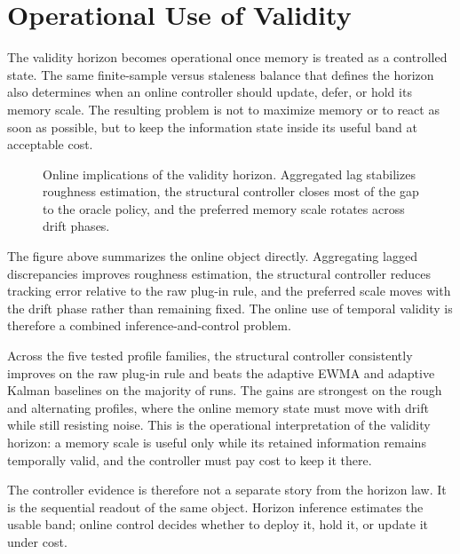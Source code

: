 \section{Operational Use of Validity}\label{sec:online_adaptation}

The validity horizon becomes operational once memory is treated as a
controlled state. The same finite-sample versus staleness balance that defines
the horizon also determines when an online controller should update, defer, or
hold its memory scale. The resulting problem is not to maximize memory or to
react as soon as possible, but to keep the information state inside its useful
band at acceptable cost.

\begin{figure}[!htbp]
\centering
{}
\caption{Online implications of the validity horizon. Aggregated lag
stabilizes roughness estimation, the structural controller closes most of the gap
to the oracle policy, and the preferred memory scale rotates across drift
phases.}
\label{fig:online_implications}
\end{figure}

The figure above summarizes the online object directly. Aggregating lagged
discrepancies improves roughness estimation, the structural controller reduces
tracking error relative to the raw plug-in rule, and the preferred scale moves
with the drift phase rather than remaining fixed. The online use of temporal
validity is therefore a combined inference-and-control problem.



Across the five tested profile families, the structural controller consistently
improves on the raw plug-in rule and beats the adaptive EWMA and adaptive
Kalman baselines on the majority of runs. The gains are strongest on the rough
and alternating profiles, where the online memory state must move with drift
while still resisting noise. This is the operational interpretation of the
validity horizon: a memory scale is useful only while its retained
information remains temporally valid, and the controller must pay cost to keep
it there.

The controller evidence is therefore not a separate story from the horizon law.
It is the sequential readout of the same object. Horizon inference estimates the
usable band; online control decides whether to deploy it, hold it, or update it
under cost.

